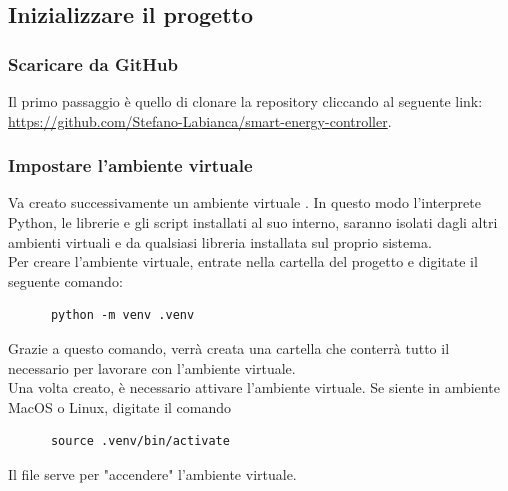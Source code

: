 \documentclass[12pt, letterpaper]{article}
\begin{document}
\newpage

\begin{appendices}

      \subsection{Inizializzare il progetto}

      \subsubsection{Scaricare da GitHub}

      Il primo passaggio è quello di clonare la repository cliccando al seguente link:
      \url{https://github.com/Stefano-Labianca/smart-energy-controller}. \\

      \subsubsection{Impostare l'ambiente virtuale}

      \noindent Va creato successivamente un ambiente virtuale \cite{create-venv}. In questo modo l'interprete Python,
      le librerie e gli script installati al suo interno, saranno isolati dagli altri ambienti
      virtuali e da qualsiasi libreria installata sul proprio sistema. \\

      \noindent Per creare l'ambiente virtuale, entrate nella cartella del progetto e
      digitate il seguente comando:

      \begin{verbatim}
      python -m venv .venv
\end{verbatim}

      \noindent Grazie a questo comando, verrà creata una cartella  che conterrà tutto il
      necessario per lavorare con l'ambiente virtuale. \\

      \noindent Una volta creato, è necessario attivare l'ambiente virtuale.
      Se siente in ambiente MacOS o Linux, digitate il comando

      \begin{verbatim}
      source .venv/bin/activate
\end{verbatim}

      \noindent Il file  serve per "accendere" l'ambiente virtuale. \\


\end{appendices}
\end{document}
